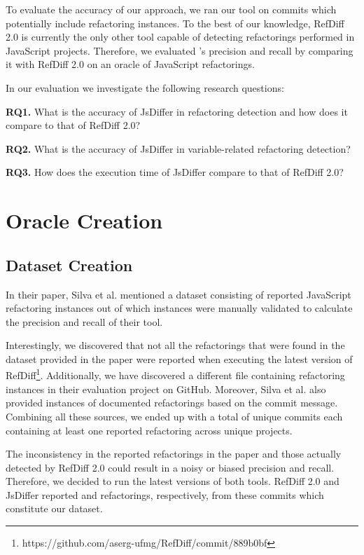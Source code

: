 \documentclass[letterpaper,12pt,onecolumn,final]{report}
\begin{document}
To evaluate the accuracy of our approach, we ran our tool on \evTotalCommits{} commits which potentially include refactoring instances. To the best of our knowledge, RefDiff 2.0 \cite{Silva2020} is currently the only other tool capable of detecting refactorings performed in JavaScript projects. Therefore, we evaluated \toolname{}'s precision and recall by comparing it with RefDiff 2.0 on an oracle of \oracleValidatedInstances{} JavaScript refactorings.

In our evaluation we investigate the following research questions:

\textbf{RQ1.} What is the accuracy of JsDiffer in refactoring detection and how does it compare to that of RefDiff 2.0?

\textbf{RQ2.} What is the accuracy of JsDiffer in variable-related refactoring detection?

\textbf{RQ3.} How does the execution time of JsDiffer compare to that of RefDiff 2.0?

\section {Oracle Creation}

\subsection {Dataset Creation}
In their paper, Silva et al. \cite{Silva2020} mentioned a dataset consisting of \evRefDiffReportedCount{} reported JavaScript refactoring instances out of which \evRefDiffValidatedCount{} instances were manually validated to calculate the precision and recall of their tool.

Interestingly, we discovered that not all the refactorings that were found in the dataset provided in the paper were reported when executing the latest version of RefDiff\footnote{https://github.com/aserg-ufmg/RefDiff/commit/889b0bf}. Additionally, we have discovered a different file containing \evRefDiffJsDataCsvCount{} refactoring instances in their evaluation project on GitHub. Moreover, Silva et al. also provided  \evRefDiffDocumentedCount{} instances of documented refactorings based on the commit message. Combining all these sources, we ended up with a total of \evTotalCommits{} unique commits each containing at least one reported refactoring across \evTotalProjectCounts{} unique projects.

The inconsistency in the reported refactorings in the paper and those actually detected by RefDiff 2.0 could result in a noisy or biased precision and recall. Therefore, we decided to run the latest versions of both tools. RefDiff 2.0 and JsDiffer reported \evRefDiffToolTotalRefCount{} and \evJsDifferToolTotalRefCount{} refactorings, respectively, from these \evTotalCommits{} commits which constitute our dataset.
\end{document}
